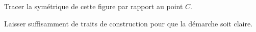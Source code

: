 
\begin{exercice}\label{exo2smath-0081}

    Tracer la symétrique de cette figure par rapport au point \( C\).

\begin{center}
   
\end{center}
Laisser suffisamment de traits de construction pour que la démarche soit claire.


\end{exercice}
